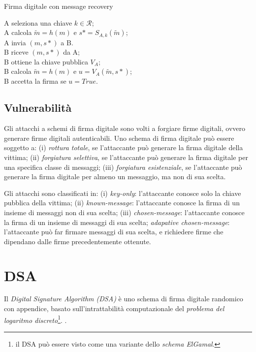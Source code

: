\bigskip
\begin{algorithm}[H]
  \caption{Firma digitale con message recovery}
  \label{alg:digital-signature-message-recovery}
  \SetAlgoNoLine
  A seleziona una chiave $k \in \mathcal{R}$;\\
  A calcola $\tilde{m}=h(m)$ e $s*=S_{A,k}(\tilde{m})$;\\
  A invia $(m,s*)$ a B.\\

  B riceve $(m,s*)$ da A;\\
  B ottiene la chiave pubblica $V_{A}$;\\
  B calcola $\tilde{m}=h(m)$ e $u=V_{A}(\tilde{m},s*)$;\\
  B accetta la firma se $u=True$.
\end{algorithm}


\subsection{Vulnerabilità}
Gli attacchi a schemi di firma digitale sono volti a forgiare firme digitali, ovvero generare firme digitali autenticabili.
Uno schema di firma digitale può essere soggetto a:
(i) \textit{rottura totale}, se l'attaccante può generare la firma digitale della vittima;
(ii) \textit{forgiatura selettiva}, se l'attaccante può generare la firma digitale per una specifica classe di messaggi;
(iii) \textit{forgiatura esistenziale}, se l'attaccante può generare la firma digitale per almeno un messaggio, ma non di sua scelta.

Gli attacchi sono classificati in:
(i) \textit{key-only}: l'attaccante conosce solo la chiave pubblica della vittima;
(ii) \textit{known-message}: l'attaccante conosce la firma di un insieme di messaggi non di sua scelta;
(iii) \textit{chosen-message}: l'attaccante conosce la firma di un insieme di messaggi di sua scelta;
\textit{adapative chosen-message}: l'attaccante può far firmare messaggi di sua scelta, e richiedere firme che dipendano dalle firme precedentemente ottenute.

\section{DSA}
Il \textit{Digital Signature Algorithm (DSA)} è uno schema di firma digitale randomico con appendice, basato sull'intrattabilità computazionale del \textit{problema del logaritmo discreto}\footnote{il DSA può essere visto come una variante dello \textit{schema ElGamal}.}.
.

